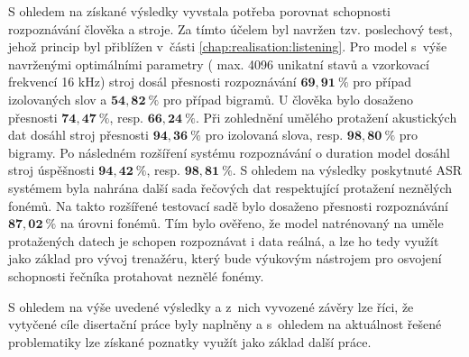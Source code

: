 S ohledem na získané výsledky vyvstala potřeba porovnat schopnosti rozpoznávání člověka a stroje. Za tímto účelem byl navržen tzv. poslechový test, jehož princip byl přiblížen v~části \ref{chap:realisation:listening}. Pro model s~výše navrženými optimálními parametry ( max. 4096 unikatní stavů a vzorkovací frekvencí 16 kHz) stroj dosál přesnosti rozpoznávání  $\boldsymbol{69,91~\%}$ pro případ izolovaných slov a $\boldsymbol{54,82~\%}$ pro případ bigramů. U člověka bylo dosaženo přesnosti $\boldsymbol{74,47~\%}$, resp. $\boldsymbol{66,24~\%}$. Při zohlednění umělého protažení akustických dat dosáhl stroj přesnosti $\boldsymbol{94,36~\%}$ pro izolovaná slova, resp. $\boldsymbol{98,80~\%}$ pro bigramy. Po následném rozšíření systému rozpoznávání o duration model dosáhl stroj úspěšnosti $\boldsymbol{94,42~\%}$, resp. $\boldsymbol{98,81~\%}$. S ohledem na výsledky poskytnuté ASR systémem byla nahrána další sada řečových dat respektující protažení neznělých fonémů. Na takto rozšířené testovací sadě bylo dosaženo přesnosti rozpoznávání $\boldsymbol{87,02~\%}$ na úrovni fonémů. Tím bylo ověřeno, že model natrénovaný na uměle protažených datech je schopen rozpoznávat i data reálná, a lze ho tedy využít jako základ pro vývoj trenažéru, který bude výukovým nástrojem pro osvojení schopnosti řečníka protahovat neznělé fonémy.

S ohledem na výše uvedené výsledky a z~nich vyvozené závěry lze říci, že vytyčené cíle disertační práce byly naplněny a s~ohledem na aktuálnost řešené problematiky lze získané poznatky využít jako základ další práce.











